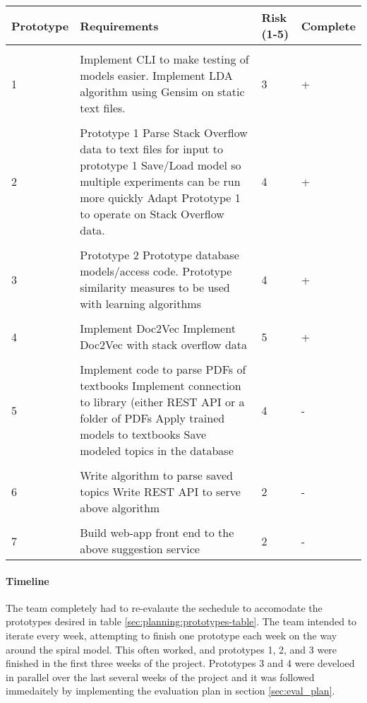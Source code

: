 \begin{table*}[t]
  \centering
  \caption{Prototypes and Schedules}
  \begin{tabular}{ l p{10cm} l l}
     \bf Prototype & \bf Requirements & \bf Risk (1-5) & \bf Complete \\ \hline \\
    1 & 
         Implement CLI to make testing of models easier. 
         \newline Implement LDA algorithm using Gensim on static text files.  
         & 3 & + \\ \\
    2 &
        Prototype 1
        Parse Stack Overflow data to text files for input to prototype 1
        Save/Load model so multiple experiments can be run more quickly
        Adapt Prototype 1 to operate on Stack Overflow data.
        & 4 & + \\ \\
    3 &
        Prototype 2
        Prototype database models/access code.
        Prototype similarity measures to be used with learning algorithms
        & 4 & + \\ \\
    4 &
        Implement Doc2Vec
        Implement Doc2Vec with stack overflow data
        & 5 & + \\ \\
    5 &
        Implement code to parse PDFs of textbooks
        Implement connection to library (either REST API or a folder of PDFs
        Apply trained models to textbooks
        Save modeled topics in the database
        & 4 & - \\ \\
    6 &
        Write algorithm to parse saved topics
        Write REST API to serve above algorithm
        & 2 & - \\ \\
    7 &
        Build web-app front end to the above suggestion service
        & 2 & - 
  \end{tabular} \label{sec:planning:prototypes-table}
\end{table*}

\paragraph{Timeline}
The team completely had to re-evalaute the sechedule to accomodate the
prototypes desired in table \ref{sec:planning:prototypes-table}.
The team intended to iterate every week, attempting to finish one
prototype each week on the way around the spiral model.
This often worked, and prototypes 1, 2, and 3 were finished in the
first three weeks of the project.
Prototypes 3 and 4 were develoed in parallel over the last several
weeks of the project and it was followed immedaitely by implementing
the evaluation plan in section \ref{sec:eval_plan}.

